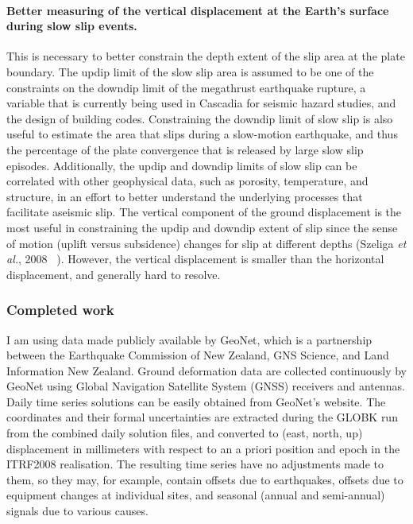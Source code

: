 \documentclass[letterpaper, 12pt]{article}
\begin{document}
\paragraph{Better measuring of the vertical displacement at the Earth's surface during slow slip events.} This is necessary to better constrain the depth extent of the slip area at the plate boundary. The updip limit of the slow slip area is assumed to be one of the constraints on the downdip limit of the megathrust earthquake rupture, a variable that is currently being used in Cascadia for seismic hazard studies, and the design of building codes. Constraining the downdip limit of slow slip is also useful to estimate the area that slips during a slow-motion earthquake, and thus the percentage of the plate convergence that is released by large slow slip episodes. Additionally, the updip and downdip limits of slow slip can be correlated with other geophysical data, such as porosity, temperature, and structure, in an effort to better understand the underlying processes that facilitate aseismic slip. The vertical component of the ground displacement is the most useful in constraining the updip and downdip extent of slip since the sense of motion (uplift versus subsidence) changes for slip at different depths (Szeliga \textit{et al.}, 2008 ~\cite{SZE_2008}). However, the vertical displacement is smaller than the horizontal displacement, and generally hard to resolve.

\subsubsection*{Completed work}

I am using data made publicly available by GeoNet, which is a partnership between the Earthquake Commission of New Zealand, GNS Science, and Land Information New Zealand. Ground deformation data are collected continuously by GeoNet using Global Navigation Satellite System (GNSS) receivers and antennas. Daily time series solutions can be easily obtained from GeoNet's website. The coordinates and their formal uncertainties are extracted during the GLOBK run from the combined daily solution files, and converted to (east, north, up) displacement in millimeters with respect to an a priori position and epoch in the ITRF2008 realisation. The resulting time series have no adjustments made to them, so they may, for example, contain offsets due to earthquakes, offsets due to equipment changes at individual sites, and seasonal (annual and semi-annual) signals due to various causes. \\
\end{document}
